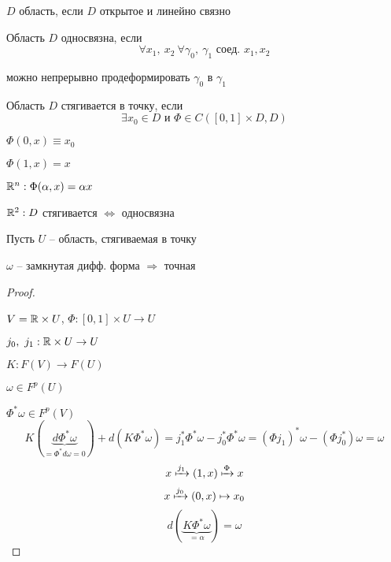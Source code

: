     \begin{definition}
        $D$ область, если $D$ открытое и линейно связно
    \end{definition}

    \begin{definition}
        Область $D$ односвязна, если
        \[
            \forall x_1, \ x_2 \ \forall \gamma_0, \ \gamma_1 \text{ соед. } x_1, x_2   
        \]
        \par можно непрерывно продеформировать $\gamma_0$ в $\gamma_1$
    \end{definition}

    \begin{definition}
        Область $D$ стягивается в точку, если
        \[
            \exists x_0 \in D \text{ и } \Phi \in C([0, 1] \times D, D)    
        \]
        \par $\Phi(0, x) \equiv x_0$
        \par $\Phi(1, x) = x$
        \par $\mathbb{R}^n : \Phi(\alpha, x) = \alpha x$
        \par $\mathbb{R}^2 : D$ стягивается $\Leftrightarrow$ односвязна %
    \end{definition}

    \begin{lemma*}[Пуанкаре]
        Пусть $U$ -- область, стягиваемая в точку
        \par $\omega$ -- замкнутая дифф. форма $\Rightarrow$ точная
    \end{lemma*}
    \begin{proof} $ $
        \par $V = \mathbb{R} \times U$, $\Phi : [0, 1] \times U \rightarrow U$
        \par $j_0, \ j_1 : \mathbb{R} \times U \rightarrow U$
        \par $K : F(V) \rightarrow F(U)$
        \par $\omega \in F^p(U)$
        \par $\Phi^* \omega \in F^p(V)$
        \[
            K(\underbrace{d\Phi^* \omega}_{= \Phi^* d\omega = 0}) + d(K\Phi^* \omega) = j_1^* \Phi^* \omega - j_0^* \Phi^* \omega = (\Phi j_1)^* \omega - (\Phi j_0^*) \omega = \omega
        \]
        \[
            x \xmapsto[]{j_1} (1, x) \xmapsto[]{\Phi} x
        \]
        \[
            x \xmapsto[]{j_0} (0, x) \mapsto x_0    
        \]
        \[
            d(\underbrace{K\Phi^* \omega}_{=\alpha}) = \omega    
        \]
    \end{proof}

